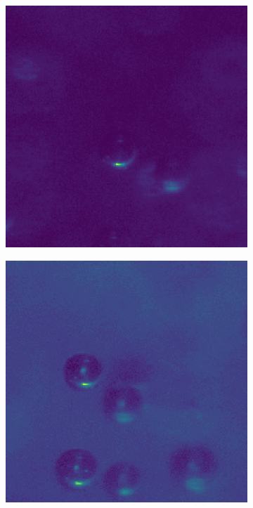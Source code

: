 			\begin{figure}
				\begin{subfigure}[b]{.55\textwidth}
					\centering
					\includegraphics[scale=.3]{images/rad_calib_1_COLOR.png}
					\caption{}
				\end{subfigure}
				\begin{subfigure}[b]{.55\textwidth}
					\centering
					\includegraphics[scale=.3]{images/rad_calib_2_COLOR.jpg}
					\caption{}
				\end{subfigure}

\end{figure}

